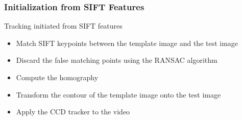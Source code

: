 \documentclass[english,10pt,presentation]{beamer}
\begin{document}
\begin{frame}
\frametitle{Initialization from SIFT Features}
\label{sec-6_3}
\begin{exampleblock}{Tracking initiated from SIFT features}
\label{sec-6_3_1}
\begin{itemize}

\item Match SIFT keypoints between the template image and the test image\\
\label{sec-6_3_1_1}%
\item Discard the false matching points using the RANSAC algorithm\\
\label{sec-6_3_1_2}%
\item Compute the homography\\
\label{sec-6_3_1_3}%
\item Transform the contour of the template image onto the test image\\
\label{sec-6_3_1_4}%
\item Apply the CCD tracker to the video\\
\label{sec-6_3_1_5}%
\end{itemize} %
\end{exampleblock}
\end{frame}
\end{document}
